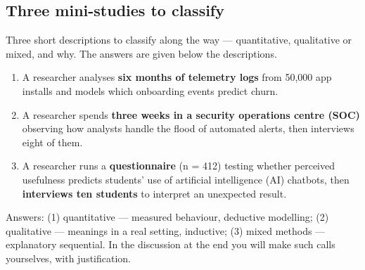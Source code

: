 \documentclass[11pt,a4paper,british,twoside=false,headings=small,chapterprefix=false,numbers=noenddot]{scrbook}
\begin{document}
\subsection{Three mini-studies to classify}
Three short descriptions to classify along the way --- quantitative, qualitative or mixed, and why. The answers are given below the descriptions.
\begin{center}\small
\small
  \begin{enumerate}\setlength{\itemsep}{0.7em}
    \item A researcher analyses \textbf{six months of telemetry logs} from
          50{,}000 app installs and models which onboarding events predict churn.
    \item A researcher spends \textbf{three weeks in a security operations
          centre (SOC)} observing how analysts handle the flood of automated
          alerts, then interviews eight of them.
    \item A researcher runs a \textbf{questionnaire} (n = 412) testing whether
          perceived usefulness predicts students' use of artificial intelligence (AI) chatbots, then
          \textbf{interviews ten students} to interpret an unexpected result.
  \end{enumerate}
  
  {\color{kgrey}\small Answers: (1) quantitative --- measured behaviour,
  deductive modelling; (2) qualitative --- meanings in a real setting,
  inductive; (3) mixed methods --- explanatory sequential. In the discussion at the end you
  will make such calls yourselves, with justification.}
\end{center}
\end{document}
